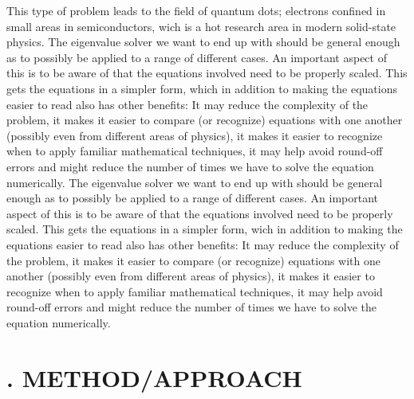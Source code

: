 \documentclass[twocolumn]{article}
\begin{document}
This type of problem leads to the field of quantum dots; electrons confined in small areas in semiconductors, wich is a hot research area in modern solid-state physics.
\newline
The eigenvalue solver we want to end up with should be general enough as to possibly be applied to a range of different cases. 
An important aspect of this is to be aware of that the equations involved need to be properly scaled. This gets the equations in a simpler form, which in addition to making the equations easier to read also has other benefits: It may reduce the complexity of the problem, it makes it easier to compare (or recognize) equations with one another (possibly even from different areas of physics), it makes it easier to recognize when to apply familiar mathematical techniques, it may help avoid round-off errors and might reduce the number of times we have to solve the equation numerically.
\newline
The eigenvalue solver we want to end up with should be general enough as to possibly be applied to a range of different cases. 
An important aspect of this is to be aware of that the equations involved need to be properly scaled. This gets the equations in a simpler form, wich in addition to making the equations easier to read also has other benefits: It may reduce the complexity of the problem, it makes it easier to compare (or recognize) equations with one another (possibly even from different areas of physics), it makes it easier to recognize when to apply familiar mathematical techniques, it may help avoid round-off errors and might reduce the number of times we have to solve the equation numerically.
\newline
\section*{. METHOD/APPROACH}
\end{document}
